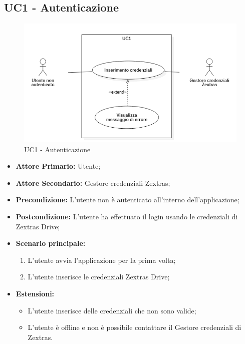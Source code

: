 \subsection{UC1 - Autenticazione}
\begin{figure}[H]
    \centering
    \includegraphics[scale = 0.7]{components/img/UC1.png}
    \caption{UC1 - Autenticazione}
\end{figure}
\begin{itemize}
\item \textbf{Attore Primario:} Utente;
\item \textbf{Attore Secondario:} Gestore credenziali Zextras;
\item \textbf{Precondizione:} L'utente non è autenticato all'interno dell'applicazione;
\item \textbf{Postcondizione:} L'utente ha effettuato il login usando le credenziali di Zextras Drive;
\item \textbf{Scenario principale:}
    \begin{enumerate}
    \item L'utente avvia l'applicazione per la prima volta;
    \item L'utente inserisce le credenziali Zextras Drive;
    \end{enumerate}
\item \textbf{Estensioni:}
\begin{itemize}
\item L'utente inserisce delle credenziali che non sono valide;
\item L'utente è offline e non è possibile contattare il Gestore credenziali di Zextras.
\end{itemize}
\end{itemize}